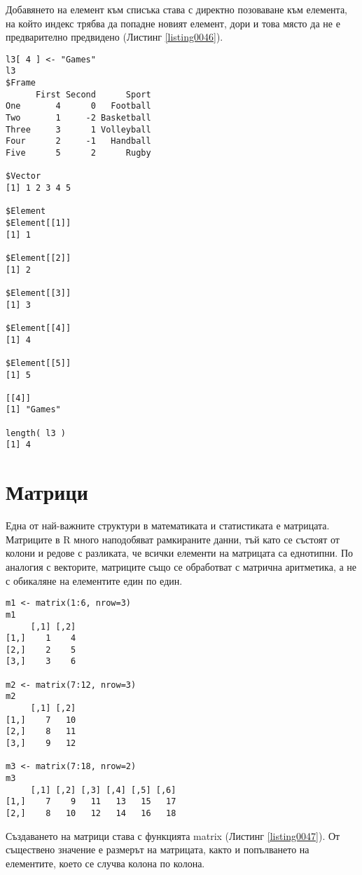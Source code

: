 Добавянето на елемент към списъка става с директно позоваване към елемента, на който индекс трябва да попадне новият елемент, дори и това място да не е предварително предвидено (Листинг \ref{listing0046}).

\begin{lstlisting}[caption=Добавяне на елемент, label=listing0046]
l3[ 4 ] <- "Games"
l3
$Frame
      First Second      Sport
One       4      0   Football
Two       1     -2 Basketball
Three     3      1 Volleyball
Four      2     -1   Handball
Five      5      2      Rugby

$Vector
[1] 1 2 3 4 5

$Element
$Element[[1]]
[1] 1

$Element[[2]]
[1] 2

$Element[[3]]
[1] 3

$Element[[4]]
[1] 4

$Element[[5]]
[1] 5

[[4]]
[1] "Games"

length( l3 )
[1] 4
\end{lstlisting}

\section{Матрици}

Една от най-важните структури в математиката и статистиката е матрицата. Матриците в R много наподобяват рамкираните данни, тъй като се състоят от колони и редове с разликата, че всички елементи на матрицата са еднотипни. По аналогия с векторите, матриците също се обработват с матрична аритметика, а не с обикаляне на елементите един по един.

\begin{lstlisting}[caption=Създаване на матрици, label=listing0047]
m1 <- matrix(1:6, nrow=3)
m1
     [,1] [,2]
[1,]    1    4
[2,]    2    5
[3,]    3    6

m2 <- matrix(7:12, nrow=3)
m2
     [,1] [,2]
[1,]    7   10
[2,]    8   11
[3,]    9   12

m3 <- matrix(7:18, nrow=2)
m3
     [,1] [,2] [,3] [,4] [,5] [,6]
[1,]    7    9   11   13   15   17
[2,]    8   10   12   14   16   18
\end{lstlisting}

Създаването на матрици става с функцията matrix (Листинг \ref{listing0047}). От съществено значение е размерът на матрицата, както и попълването на елементите, което се случва колона по колона.

